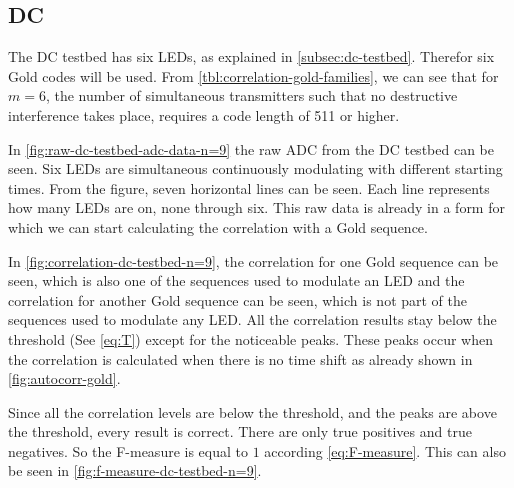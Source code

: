 
\subsection{DC}

The DC testbed has six LEDs, as explained in \autoref{subsec:dc-testbed}.
Therefor six Gold codes will be used.
From \autoref{tbl:correlation-gold-families}, we can see that for $m = 6$, the number of simultaneous transmitters such that no destructive interference takes place, requires a code length of 511 or higher.

In \autoref{fig:raw-dc-testbed-adc-data-n=9} the raw ADC from the DC testbed can be seen.
Six LEDs are simultaneous continuously modulating with different starting times.
From the figure, seven horizontal lines can be seen.
Each line represents how many LEDs are on, none through six.
This raw data is already in a form for which we can start calculating the correlation with a Gold sequence.

In \autoref{fig:correlation-dc-testbed-n=9}, the correlation for one Gold sequence can be seen, which is also one of the sequences used to modulate an LED and the correlation for another Gold sequence can be seen, which is not part of the sequences used to modulate any LED.
All the correlation results stay below the threshold (See \autoref{eq:T}) except for the noticeable peaks.
These peaks occur when the correlation is calculated when there is no time shift as already shown in \autoref{fig:autocorr-gold}.

Since all the correlation levels are below the threshold, and the peaks are above the threshold, every result is correct.
There are only true positives and true negatives.
So the F-measure is equal to $1$ according \autoref{eq:F-measure}.
This can also be seen in \autoref{fig:f-measure-dc-testbed-n=9}.


